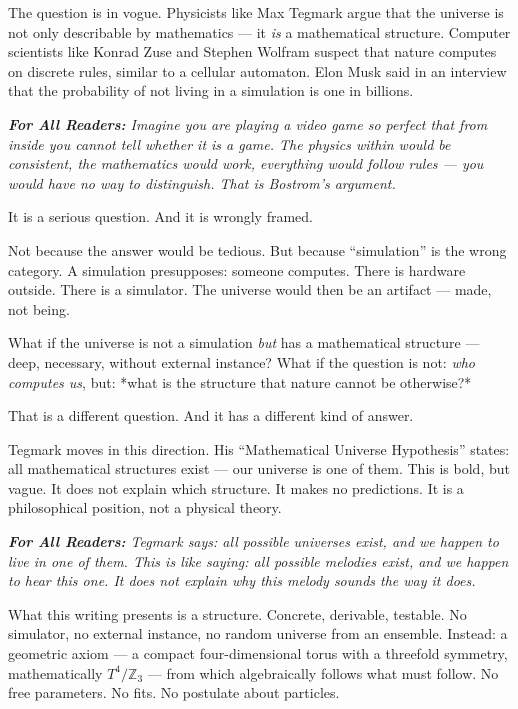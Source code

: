 \documentclass[11pt,oneside]{book}
\newenvironment{laierspur}{%
  \par\vspace{4pt}%
  \noindent\small\itshape\color{blue!60!black}%
  \textbf{For All Readers:}\enspace\ignorespaces}{%
  \par\vspace{4pt}\normalsize\normalfont\normalcolor}
\begin{document}
The question is in vogue. Physicists like Max Tegmark argue that the
universe is not only describable by mathematics — it \textit{is} a
mathematical structure. Computer scientists like Konrad Zuse and Stephen
Wolfram suspect that nature computes on discrete rules, similar to a cellular
automaton. Elon Musk said in an interview that the probability of not living
in a simulation is one in billions.

\begin{laierspur}
Imagine you are playing a video game so perfect that from inside you
cannot tell whether it is a game. The physics within would be consistent,
the mathematics would work, everything would follow rules — you would have
no way to distinguish. That is Bostrom's argument.
\end{laierspur}

It is a serious question. And it is wrongly framed.

Not because the answer would be tedious. But because \enquote{simulation} is the
wrong category. A simulation presupposes: someone computes. There is
hardware outside. There is a simulator. The universe would then be an
artifact — made, not being.

What if the universe is not a simulation \textit{but} has a mathematical
structure — deep, necessary, without external instance? What if the question
is not: \textit{who computes us}, but: *what is the structure that nature
cannot be otherwise?*

That is a different question. And it has a different kind of answer.

Tegmark moves in this direction. His \enquote{Mathematical Universe Hypothesis}
states: all mathematical structures exist — our universe is one of them.
This is bold, but vague. It does not explain which structure. It makes no
predictions. It is a philosophical position, not a physical theory.

\begin{laierspur}
Tegmark says: all possible universes exist, and we happen to live in one
of them. This is like saying: all possible melodies exist, and we happen to
hear this one. It does not explain why this melody sounds the way it does.
\end{laierspur}

What this writing presents is a structure. Concrete, derivable, testable.
No simulator, no external instance, no random universe from an ensemble.
Instead: a geometric axiom — a compact four-dimensional torus with a
threefold symmetry, mathematically $T^4/\mathbb{Z}_3$ — from which
algebraically follows what must follow. No free parameters. No fits. No
postulate about particles.
\end{document}
